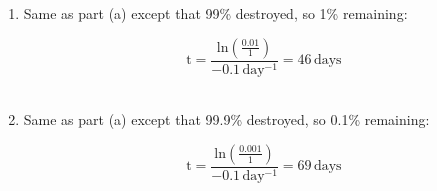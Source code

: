 \documentclass[12pt,letterpaper]{article}
\begin{document}
\begin{enumerate}
\begin{enumerate}
\item Same as part (a) except that 99\% destroyed, so 1\% remaining:

\begin{equation*}
\mathrm{t = \frac{ln(\frac{0.01}{1})}{-0.1\, day^{-1}}  = 46\, days}
\end{equation*}\\

\item Same as part (a) except that 99.9\% destroyed, so 0.1\% remaining:

\begin{equation*}
\mathrm{t = \frac{ln(\frac{0.001}{1})}{-0.1\, day^{-1}}  = 69\, days}
\end{equation*}\\

\end{enumerate}
















\end{enumerate}
\end{document}
